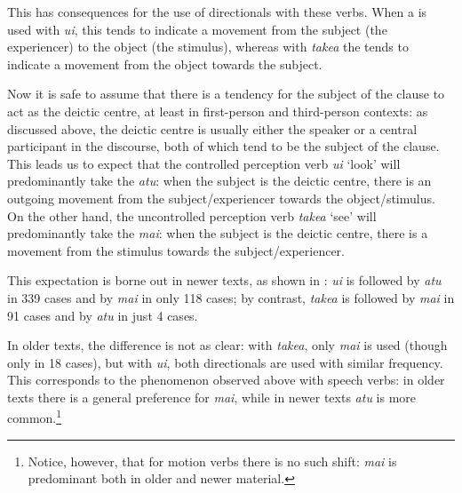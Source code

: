 This has consequences for the use of directionals with these verbs. When a  is used with \textit{u{\ꞌ}i}, this  tends to indicate a movement from the subject (the experiencer) to the object (the stimulus), whereas with \textit{take{\ꞌ}a} the  tends to indicate a movement from the object towards the subject. 

Now it is safe to assume that there is a tendency for the subject of the clause to act as the deictic centre, at least in first-person and third-person contexts: as discussed above, the deictic centre is usually either the speaker or a central participant in the discourse, both of which tend to be the subject of the clause. This leads us to expect that the controlled perception verb \textit{u{\ꞌ}i} ‘look’ will predominantly take the  \textit{atu}: when the subject is the deictic centre, there is an outgoing movement from the subject/experiencer towards the object/stimulus. On the other hand, the uncontrolled perception verb \textit{take{\ꞌ}a} ‘see’ will predominantly take the  \textit{mai}: when the subject is the deictic centre, there is a movement from the stimulus towards the subject/experiencer. 

This expectation is borne out in newer texts, as shown in : \textit{u{\ꞌ}i} is followed by \textit{atu} in 339 cases and by \textit{mai} in only 118 cases; by contrast, \textit{take{\ꞌ}a} is followed by \textit{mai} in 91 cases and by \textit{atu} in just 4 cases.

In older texts, the difference is not as clear: with \textit{take{\ꞌ}a}, only \textit{mai} is used (though only in 18 cases), but with \textit{u{\ꞌ}i}, both directionals are used with similar frequency. This corresponds to the phenomenon observed above with speech verbs: in older texts there is a general preference for \textit{mai}, while in newer texts \textit{atu} is more common.\footnote{\label{fn:366}Notice, however, that for motion verbs there is no such shift: \textit{mai} is predominant both in older and newer material.}

